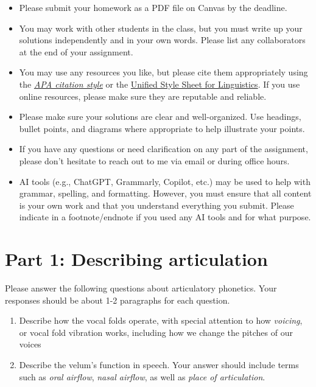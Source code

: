 \documentclass[12pt, letterpaper]{article}
\begin{document}
\begin{tcolorbox}[colback=LightGray!10!white,colframe=LightGray!75!black,title=Instructions]
    \begin{itemize}
        \item Please submit your homework as a PDF file on Canvas by the deadline.
        \item You may work with other students in the class, but you must write up your solutions independently and in your own words. Please list any collaborators at the end of your assignment.
        \item You may use any resources you like, but please cite them appropriately using the \href{https://apastyle.apa.org/}{\textit{APA citation style}} or the \href{https://langsci-press.org/unifiedstylesheet}{Unified Style Sheet for Linguistics}. If you use online resources, please make sure they are reputable and reliable.
        \item Please make sure your solutions are clear and well-organized. Use headings, bullet points, and diagrams where appropriate to help illustrate your points.
        \item If you have any questions or need clarification on any part of the assignment, please don't hesitate to reach out to me via email or during office hours.
        \item AI tools (e.g., ChatGPT, Grammarly, Copilot, etc.) may be used to help with grammar, spelling, and formatting. However, you must ensure that all content is your own work and that you understand everything you submit. Please indicate in a footnote/endnote if you used any AI tools and for what purpose.
    \end{itemize}
\end{tcolorbox}

\section*{Part 1: Describing articulation} \label{sec:describingarticulation}

Please answer the following questions about articulatory phonetics. Your responses should be about 1-2 paragraphs for each question. 

\begin{enumerate}
    \item Describe how the vocal folds operate, with special attention to how \textit{voicing}, or vocal fold vibration works, including how we change the pitches of our voices
    \item Describe the velum’s function in speech. Your answer should include terms such as \textit{oral airflow}, \textit{nasal airflow}, as well as \textit{place of articulation}.
\end{enumerate}
\end{document}
